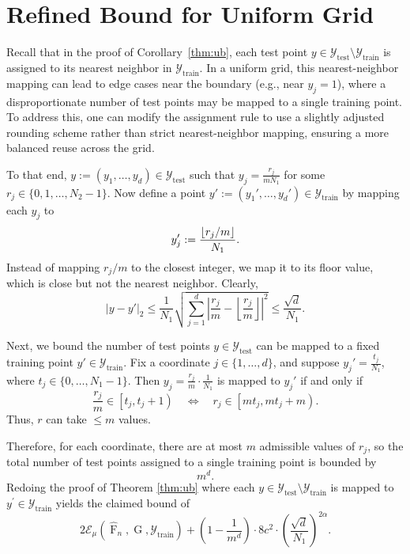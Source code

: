 \documentclass[11pt]{article}
\theoremstyle{plain}
\newcommand{\Ycal}{\mathcal{Y}}
\DeclarePairedDelimiter\floor{\lfloor}{\rfloor}
\begin{document}
\section{Refined Bound for Uniform Grid}\label{appdx:refined}



Recall that in the proof of Corollary~\ref{thm:ub}, each test point $ y \in \Ycal_{\mathrm{test}} \setminus \Ycal_{\mathrm{train}} $ is assigned to its nearest neighbor in $ \Ycal_{\mathrm{train}} $. In a uniform grid, this nearest-neighbor mapping can lead to edge cases near the boundary (e.g., near $ y_j = 1 $), where a disproportionate number of test points may be mapped to a single training point. To address this, one can modify the assignment rule to use a slightly adjusted rounding scheme rather than strict nearest-neighbor mapping, ensuring a more balanced reuse across the grid.





To that end, $y := (y_1, \ldots, y_d) \in \Ycal_{\mathrm{test}}$ such that $y_j = \frac{r_j}{mN_1}$ for some $r_j \in \{0,1,\ldots,N_2 - 1\}$. 
Now define a point $y' := (y_1', \ldots, y_d') \in \Ycal_{\mathrm{train}}$ by mapping each $y_j$ to
\[
y_j' := \frac{\floor{r_j/m}}{N_1}.
\]
Instead of mapping $r_j/m$ to the closest integer, we map it to its floor value, which is close but not the nearest neighbor. Clearly,
\[
|y - y'|_2 \leq \frac{1}{N_1} \sqrt{ \sum_{j=1}^d \left| \frac{r_j}{m} - \left\lfloor \frac{r_j}{m} \right\rfloor \right|^2 } \leq \frac{\sqrt{d}}{N_1}.
\]


\medskip 
Next, we bound the number of test points $y \in \Ycal_{\mathrm{test}}$ can be mapped to a fixed training point $y' \in \Ycal_{\mathrm{train}}$. Fix a coordinate $j \in \{1, \ldots, d\}$, and suppose $y_j' = \frac{t_j}{N_1}$, where $t_j \in \{0, \ldots, N_1 - 1\}$. Then $y_j = \frac{r_j}{m} \cdot \frac{1}{N_1}$ is mapped to $y_j'$ if and only if
\[
\frac{r_j}{m} \in \left[t_j, t_j+1\right) \quad \Longleftrightarrow \quad r_j \in \left[ m t_j, mt_j +m \right).
\]
Thus, $r$ can take  $\leq m$ values.

Therefore, for each coordinate, there are at most $m$ admissible values of $r_j$, so the total number of test points assigned to a single training point is bounded by
\[
m^d.
\]
Redoing the proof of Theorem \ref{thm:ub} where each $y \in  \Ycal_{\mathrm{test}}\setminus \Ycal_{\mathrm{train}}$ is mapped to $y^{\prime} \in \Ycal_{\mathrm{train}}$ yields the claimed bound of 
\[2\mathcal{E}_\mu(\widehat{\operatorname{F}}_n, \operatorname{G}, \Ycal_{\mathrm{train}}) + \left( 1-\frac{1}{m^d}\right) \cdot 8c^2\cdot  \left(\frac{\sqrt{d}}{N_1} \right)^{2\alpha}.\]
\end{document}
